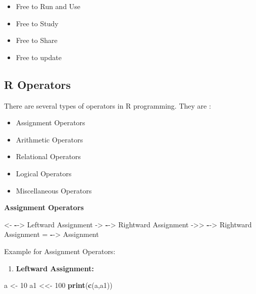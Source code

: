 \documentclass[
]{article}
\newenvironment{Shaded}{\begin{snugshade}}{\end{snugshade}}
\newcommand{\DecValTok}[1]{\textcolor[rgb]{0.00,0.00,0.81}{#1}}
\newcommand{\FunctionTok}[1]{\textcolor[rgb]{0.13,0.29,0.53}{\textbf{#1}}}
\newcommand{\NormalTok}[1]{#1}
\newcommand{\OtherTok}[1]{\textcolor[rgb]{0.56,0.35,0.01}{#1}}
\newcommand{\SpecialCharTok}[1]{\textcolor[rgb]{0.81,0.36,0.00}{\textbf{#1}}}
\providecommand{\tightlist}{%
  \setlength{\itemsep}{0pt}\setlength{\parskip}{0pt}}
\begin{document}
\begin{itemize}
\item
  Free to Run and Use
\item
  Free to Study
\item
  Free to Share
\item
  Free to update
\end{itemize}

\subsection{R Operators}\label{r-operators}

There are several types of operators in R programming. They are :

\begin{itemize}
\item
  Assignment Operators
\item
  Arithmetic Operators
\item
  Relational Operators
\item
  Logical Operators
\item
  Miscellaneous Operators
\end{itemize}

\textbf{Assignment Operators}

\begin{Shaded}
\begin{Highlighting}[]
\OtherTok{\textless{}{-}}  \SpecialCharTok{{-}}\OtherTok{{-}\textgreater{}}\NormalTok{ Leftward Assignment}
\OtherTok{{-}\textgreater{}}  \SpecialCharTok{{-}}\OtherTok{{-}\textgreater{}}\NormalTok{ Rightward Assignment}
\OtherTok{{-}\textgreater{}\textgreater{}} \SpecialCharTok{{-}}\OtherTok{{-}\textgreater{}}\NormalTok{ Rightward Assignment}
\OtherTok{=}   \SpecialCharTok{{-}}\OtherTok{{-}\textgreater{}}\NormalTok{ Assignment}
\end{Highlighting}
\end{Shaded}

Example for Assignment Operators:

\begin{enumerate}
\def\labelenumi{\arabic{enumi}.}
\tightlist
\item
  \textbf{Leftward Assignment:}
\end{enumerate}

\begin{Shaded}
\begin{Highlighting}[]
\NormalTok{a }\OtherTok{\textless{}{-}} \DecValTok{10}
\NormalTok{a1 }\OtherTok{\textless{}\textless{}{-}} \DecValTok{100}
\FunctionTok{print}\NormalTok{(}\FunctionTok{c}\NormalTok{(a,a1))}
\end{Highlighting}
\end{Shaded}
\end{document}
